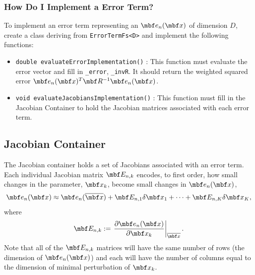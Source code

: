 \documentclass[11pt,a4,oneside]{article}
\newcommand{\txt}[1]{{\footnotesize\texttt{#1}}}
\newcommand{\listcpp}[2]{}
\begin{document}
\subsubsection{How Do I Implement a Error Term?}
To implement an error term representing an $\mbf e_n(\mbf x)$ of dimension $D$, create a class deriving from \txt{ErrorTermFs<D>} and implement the following functions:
\begin{itemize}
\item \txt{double evaluateErrorImplementation()} : This function must evaluate the error vector and fill in \txt{\_error}, \txt{\_invR}. It should return the weighted squared error $\mbf e_n(\mbf x)^T \mbf R^{-1} \mbf e_n(\mbf x)$.
\item \txt{void evaluateJacobiansImplementation()} : This function must fill in the Jacobian Container to hold the Jacobian matrices associated with each error term.
\end{itemize}

\subsection{Jacobian Container \label{ss:JacobianContainer}}
The Jacobian container holds a set of Jacobians associated with an error term. Each individual Jacobian matrix $\mbf E_{n,k}$ encodes, to first order, how small changes in the parameter, $\mbf x_k$, become small changes in $\mbf e_n(\mbf x)$,
\begin{equation}
  \label{eq:jacobian-container}
  \mbf e_n(\mbf x) \approx \mbf e_n(\mbfbar x) + \mbf E_{n,1}\mbfdel x_{1} + \dots + \mbf E_{n,K} \mbfdel x_{K},
\end{equation}
where
\begin{equation}
  \label{eq:jacobian-container-mx-definition}
  \mbf E_{n,k} := \left.\pd{\mbf e_n(\mbf x)}{\mbf x_k}\right|_{\mbfbar x}.
\end{equation}
Note that all of the $\mbf E_{n,k}$ matrices will have the same number of rows (the dimension of $\mbf e_n(\mbf x)$) and each will have the number of columns equal to the dimension of minimal perturbation of $\mbf x_k$. 
\listcpp{JacobianContainer.hpp}{../../aslam_backend/include/aslam/backend/JacobianContainer.hpp}
\end{document}
